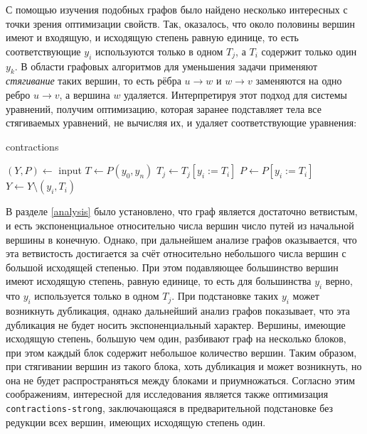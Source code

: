 \documentclass[../thesis.tex]{subfiles}
\begin{document}
С помощью изучения подобных графов было найдено несколько интересных с точки зрения оптимизации свойств. Так, оказалось, что около половины вершин имеют и входящую, и исходящую степень равную единице, то есть соответствующие $y_i$ используются только в одном $T_j$, а $T_i$ содержит только один $y_k$. В области графовых алгоритмов для уменьшения задачи применяют \textit{стягивание} таких вершин, то есть рёбра $u\rightarrow w$ и $w\rightarrow v$ заменяются на одно ребро $u\rightarrow v$, а вершина $w$ удаляется. Интерпретируя этот подход для системы уравнений, получим оптимизацию, которая заранее подставляет тела все стягиваемых уравнений, не вычисляя их, и удаляет соответствующие уравнения:

\begin{megaalgorithm}
    \caption{contractions}
  \begin{algorithmic}
    \State $(Y, P)\gets$ input
    \State $T \gets P(y_0, y_n)$
                \State $T_j \gets T_j [y_i := T_i]$
            \EndFor
            \State $P \gets P [y_i := T_i]$
            \State $Y \gets Y \setminus (y_i, T_i)$
        \EndIf
    \EndFor
    \State {}
  \end{algorithmic}
\end{megaalgorithm}

В разделе \ref{analysis} было установлено, что граф является достаточно ветвистым, и есть экспоненциальное относительно числа вершин число путей из начальной вершины в конечную. Однако, при дальнейшем анализе графов оказывается, что эта ветвистость достигается за счёт относительно небольшого числа вершин с большой исходящей степенью. При этом подавляющее большинство вершин имеют исходящую степень, равную единице, то есть для большинства $y_i$ верно, что $y_i$ используется только в одном $T_j$. При подстановке таких $y_i$ может возникнуть дубликация, однако дальнейший анализ графов показывает, что эта дубликация не будет носить экспоненциальный характер. Вершины, имеющие исходящую степень, большую чем один, разбивают граф на несколько блоков, при этом каждый блок содержит небольшое количество вершин. Таким образом, при стягивании вершин из такого блока, хоть дубликация и может возникнуть, но она не будет распространяться между блоками и приумножаться. Согласно этим соображениям, интересной для исследования является также оптимизация \texttt{contractions-strong}, заключающаяся в предварительной подстановке без редукции всех вершин, имеющих исходящую степень один.
\end{document}
